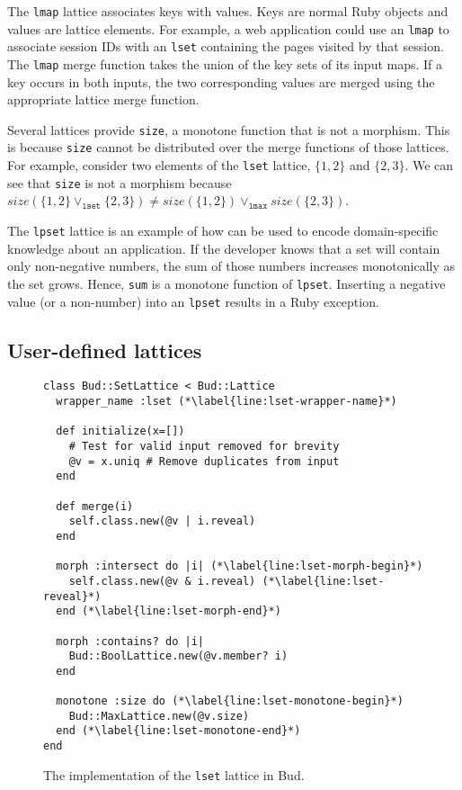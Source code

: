 The \texttt{lmap} lattice associates keys with values. Keys are normal Ruby
objects and values are lattice elements. For example, a web application could
use an \texttt{lmap} to associate session IDs with an \texttt{lset} containing
the pages visited by that session. The \texttt{lmap} merge function takes the
union of the key sets of its input maps. If a key occurs in both inputs, the two
corresponding values are merged using the appropriate lattice merge function.

Several lattices provide \texttt{size}, a monotone function that is not a
morphism. This is because \texttt{size} cannot be distributed over the merge
functions of those lattices. For example, consider two elements of the
\texttt{lset} lattice, $\{1,2\}$ and $\{2,3\}$.  We can see that \texttt{size} is not a morphism because $size(\{1,2\} \lor_{\mathtt{lset}}
\{2,3\}) \ne size(\{1,2\}) \lor_{\mathtt{lmax}} size(\{2,3\})$.

The \texttt{lpset} lattice is an example of how \lang can be used to encode
domain-specific knowledge about an application. If the developer knows that a
set will contain only non-negative numbers, the sum of those numbers increases
monotonically as the set grows. Hence, \texttt{sum} is a monotone function of
\texttt{lpset}. Inserting a negative value (or a non-number) into an
\texttt{lpset} results in a Ruby exception.

\subsection{User-defined lattices}
\begin{figure}[t]
\begin{scriptsize}
\begin{lstlisting}[deletekeywords={lset}]
class Bud::SetLattice < Bud::Lattice
  wrapper_name :lset (*\label{line:lset-wrapper-name}*)

  def initialize(x=[])
    # Test for valid input removed for brevity
    @v = x.uniq # Remove duplicates from input
  end

  def merge(i)
    self.class.new(@v | i.reveal)
  end

  morph :intersect do |i| (*\label{line:lset-morph-begin}*)
    self.class.new(@v & i.reveal) (*\label{line:lset-reveal}*)
  end (*\label{line:lset-morph-end}*)

  morph :contains? do |i|
    Bud::BoolLattice.new(@v.member? i)
  end

  monotone :size do (*\label{line:lset-monotone-begin}*)
    Bud::MaxLattice.new(@v.size)
  end (*\label{line:lset-monotone-end}*)
end
\end{lstlisting}
\end{scriptsize}
\caption{The implementation of the \texttt{lset} lattice in Bud.}
\label{fig:lattice-lset}
\end{figure}

